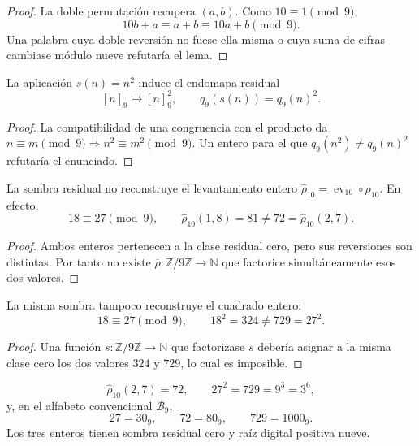 \begin{proof}
La doble permutación recupera \((a,b)\). Como \(10\equiv1\pmod9\),
\[
 10b+a\equiv a+b\equiv10a+b\pmod9.
\]
Una palabra cuya doble reversión no fuese ella misma o cuya suma de cifras
cambiase módulo nueve refutaría el lema.
\end{proof}

\begin{lemma}
\label{int:pf84:SYN30-SQ-DESC}
La aplicación \(s(n)=n^2\) induce el endomapa residual
\[
 [n]_9\longmapsto[n]_9^2,
 \qquad q_9(s(n))=q_9(n)^2.
\]
\end{lemma}

\begin{proof}
La compatibilidad de una congruencia con el producto da
\(n\equiv m\pmod9\Rightarrow n^2\equiv m^2\pmod9\). Un entero para el que
\(q_9(n^2)\ne q_9(n)^2\) refutaría el enunciado.
\end{proof}

\begin{proposition}
\label{int:pf84:SYN30-RHO-NONFAITH}
La sombra residual no reconstruye el levantamiento entero
\(\widehat\rho_{10}=\operatorname{ev}_{10}\circ\rho_{10}\). En efecto,
\[
 18\equiv27\pmod9,\qquad
 \widehat\rho_{10}(1,8)=81\ne72=\widehat\rho_{10}(2,7).
\]
\end{proposition}

\begin{proof}
Ambos enteros pertenecen a la clase residual cero, pero sus reversiones son
distintas. Por tanto no existe
\(\overline\rho:\mathbb Z/9\mathbb Z\to\mathbb N\) que factorice
simultáneamente esos dos valores.
\end{proof}

\begin{proposition}
\label{int:pf84:SYN30-SQ-NONFAITH}
La misma sombra tampoco reconstruye el cuadrado entero:
\[
 18\equiv27\pmod9,\qquad
 18^2=324\ne729=27^2.
\]
\end{proposition}

\begin{proof}
Una función \(\overline s:\mathbb Z/9\mathbb Z\to\mathbb N\) que
factorizase \(s\) debería asignar a la misma clase cero los dos valores
\(324\) y \(729\), lo cual es imposible.
\end{proof}

\begin{corollary}
\label{int:pf84:SYN30-CROSS-WITNESS}
\[
 \widehat\rho_{10}(2,7)=72,\qquad
 27^2=729=9^3=3^6,
\]
y, en el alfabeto convencional \(\mathscr B_9\),
\[
 27=30_9,\qquad72=80_9,\qquad729=1000_9.
\]
Los tres enteros tienen sombra residual cero y raíz digital positiva nueve.
\end{corollary}

